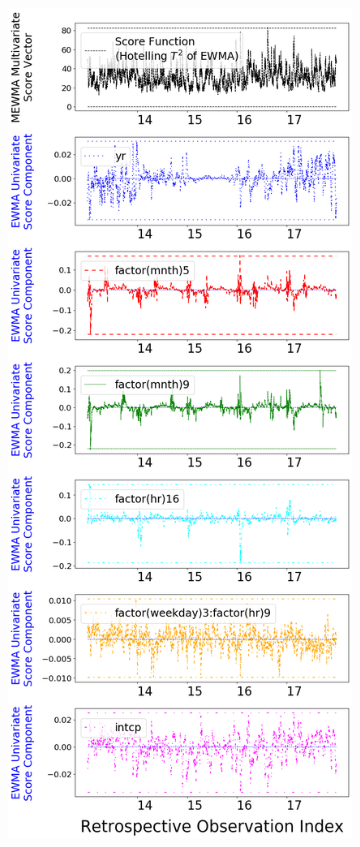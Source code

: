 \documentclass[twoside,11pt]{article}
\begin{document}
\begin{figure}[H]
\begin{subfigure}[t]{0.304\linewidth}
     \captionsetup{width=.95\linewidth}
     \caption{}
     \label{fig:bs_norm_retro}
\end{subfigure}
\begin{subfigure}[t]{0.304\linewidth}
     \centering
         \includegraphics[width=1.0\textwidth, trim=.0in .0in .0in .0in, clip]{../figures/v14/bike_sharing/reg_lin_C_2/PII_pos_single_retro_bike_fisher_mlines_with_regu_1e-08_0_0001_0_01_99_99.png}

\end{subfigure}
\end{figure}
\end{document}
